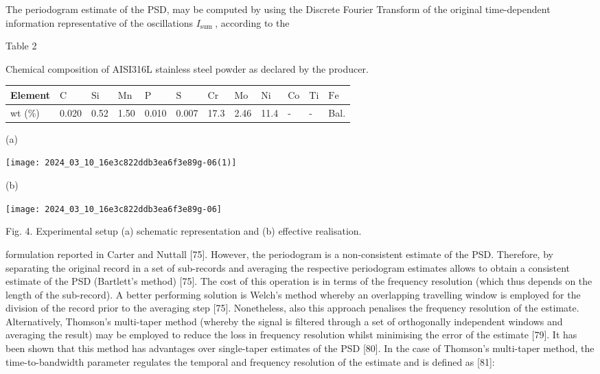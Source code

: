 \documentclass[10pt]{article}
\begin{document}
The periodogram estimate of the PSD, may be computed by using the Discrete Fourier Transform of the original time-dependent information representative of the oscillations $I_{\text {sum }}$, according to the

Table 2

Chemical composition of AISI316L stainless steel powder as declared by the producer.

\begin{center}
\begin{tabular}{llllllllllll}
\hline
Element & $\mathrm{C}$ & $\mathrm{Si}$ & $\mathrm{Mn}$ & $\mathrm{P}$ & $\mathrm{S}$ & $\mathrm{Cr}$ & $\mathrm{Mo}$ & $\mathrm{Ni}$ & $\mathrm{Co}$ & $\mathrm{Ti}$ & $\mathrm{Fe}$ \\
\hline
wt (\%) & 0.020 & 0.52 & 1.50 & 0.010 & 0.007 & 17.3 & 2.46 & 11.4 & - & - & Bal. \\
\hline
\end{tabular}
\end{center}

(a)

\begin{center}
\texttt{[image: 2024\_03\_10\_16e3c822ddb3ea6f3e89g-06(1)]}
\end{center}

(b)

\begin{center}
\texttt{[image: 2024\_03\_10\_16e3c822ddb3ea6f3e89g-06]}
\end{center}

Fig. 4. Experimental setup (a) schematic representation and (b) effective realisation.

formulation reported in Carter and Nuttall [75]. However, the periodogram is a non-consistent estimate of the PSD. Therefore, by separating the original record in a set of sub-records and averaging the respective periodogram estimates allows to obtain a consistent estimate of the PSD (Bartlett's method) [75]. The cost of this operation is in terms of the frequency resolution (which thus depends on the length of the sub-record). A better performing solution is Welch's method whereby an overlapping travelling window is employed for the division of the record prior to the averaging step [75]. Nonetheless, also this approach penalises the frequency resolution of the estimate. Alternatively, Thomson's multi-taper method (whereby the signal is filtered through a set of orthogonally independent windows and averaging the result) may be employed to reduce the loss in frequency resolution whilst minimising the error of the estimate [79]. It has been shown that this method has advantages over single-taper estimates of the PSD [80]. In the case of Thomson's multi-taper method, the time-to-bandwidth parameter regulates the temporal and frequency resolution of the estimate and is defined as [81]:
\end{document}
